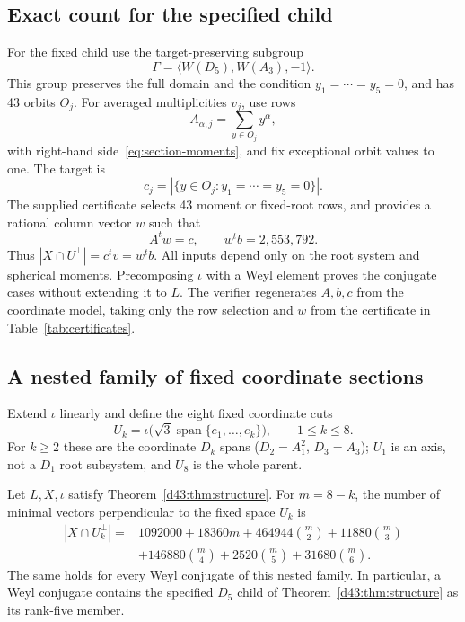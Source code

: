 \subsection{Exact count for the specified child}
For the fixed child use the target-preserving subgroup
\[
\Gamma=\langle W(D_5),W(A_3),-1\rangle.
\]
This group preserves the full domain and the condition
$y_1=\cdots=y_5=0$, and has 43 orbits $O_j$.
For averaged multiplicities $v_j$, use rows
\[
A_{\alpha,j}=\sum_{y\in O_j}y^\alpha,
\]
with right-hand side~\eqref{eq:section-moments}, and fix exceptional
orbit values to one. The target is
\[
c_j=|\{y\in O_j:y_1=\cdots=y_5=0\}|.
\]
The supplied certificate selects 43 moment or fixed-root rows, and provides
a rational column vector $w$ such that
\begin{equation}\label{d43:eq:dual}
A^tw=c,\qquad w^tb=2,553,792.
\end{equation}
Thus $|X\cap U^\perp|=c^tv=w^tb$. All inputs depend only on the
root system and spherical moments. Precomposing $\iota$ with a Weyl
element proves the conjugate cases without extending it to $L$.
The verifier regenerates $A,b,c$ from the coordinate model, taking only
the row selection and $w$ from the certificate in
Table~\ref{tab:certificates}.

\subsection{A nested family of fixed coordinate sections}
Extend $\iota$ linearly and define the eight fixed coordinate cuts
\[
 U_k=\iota\bigl(\sqrt3\operatorname{span}\{e_1,\ldots,e_k\}\bigr),
 \qquad 1\le k\le8.
\]
For $k\ge2$ these are the coordinate $D_k$ spans ($D_2=A_1^2$,
$D_3=A_3$); $U_1$ is an axis, not a $D_1$ root subsystem, and
$U_8$ is the whole parent.

\begin{theorem}\label{thm:e8-coordinate-sections}
Let $L,X,\iota$ satisfy Theorem~\ref{d43:thm:structure}.
For $m=8-k$, the number of minimal vectors perpendicular to the fixed
space $U_k$ is
\begin{equation}\label{eq:e8-coordinate-count}
\begin{split}
 |X\cap U_k^\perp|={}&1092000+18360m+464944\binom m2
                  +11880\binom m3\\
                 &+146880\binom m4+2520\binom m5+31680\binom m6.
\end{split}
\end{equation}
The same holds for every Weyl conjugate of this nested family.
In particular, a Weyl conjugate contains the specified $D_5$ child
of Theorem~\ref{d43:thm:structure} as its rank-five member.
\end{theorem}

